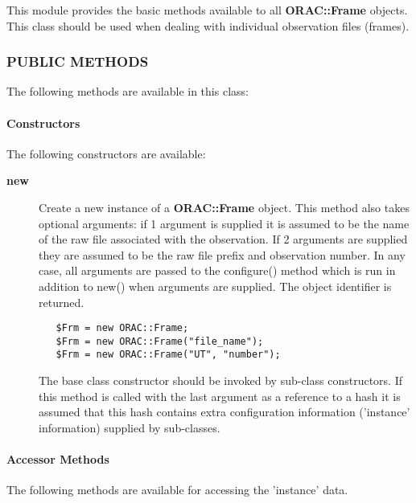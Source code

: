 This module provides the basic methods available to all \textbf{ORAC::Frame}
objects. This class should be used when dealing with individual
observation files (frames).

\subsubsection*{PUBLIC METHODS\label{ORAC::Frame_PUBLIC_METHODS}}

The following methods are available in this class:

\paragraph*{Constructors\label{ORAC::Frame_Constructors}}

The following constructors are available:

\begin{description}
\item[\textbf{new}] \mbox{}

Create a new instance of a \textbf{ORAC::Frame} object.  This method also
takes optional arguments: if 1 argument is supplied it is assumed to
be the name of the raw file associated with the observation. If 2
arguments are supplied they are assumed to be the raw file prefix and
observation number. In any case, all arguments are passed to the
configure() method which is run in addition to new() when arguments
are supplied.  The object identifier is returned.

\begin{verbatim}
   $Frm = new ORAC::Frame;
   $Frm = new ORAC::Frame("file_name");
   $Frm = new ORAC::Frame("UT", "number");
\end{verbatim}


The base class constructor should be invoked by sub-class constructors.
If this method is called with the last argument as a reference to
a hash it is assumed that this hash contains extra configuration
information ('instance' information) supplied by sub-classes.

\end{description}
\paragraph*{Accessor Methods\label{ORAC::Frame_Accessor_Methods}}

The following methods are available for accessing the 
'instance' data.

